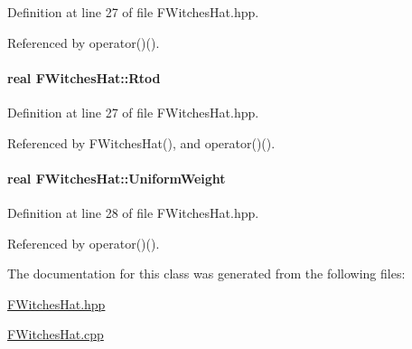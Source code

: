 \-Definition at line 27 of file \-F\-Witches\-Hat.\-hpp.



\-Referenced by operator()().

\hypertarget{classFWitchesHat_aadb3c71d235e5857a08fccb5b6a1ffef}{
\paragraph[{\-Rtod}]{\setlength{\rightskip}{0pt plus 5cm}real {\bf \-F\-Witches\-Hat\-::\-Rtod}}}\label{classFWitchesHat_aadb3c71d235e5857a08fccb5b6a1ffef}


\-Definition at line 27 of file \-F\-Witches\-Hat.\-hpp.



\-Referenced by \-F\-Witches\-Hat(), and operator()().

\hypertarget{classFWitchesHat_adb3a9d40df656e50327d3c40c505fdb6}{
\paragraph[{\-Uniform\-Weight}]{\setlength{\rightskip}{0pt plus 5cm}real {\bf \-F\-Witches\-Hat\-::\-Uniform\-Weight}}}\label{classFWitchesHat_adb3a9d40df656e50327d3c40c505fdb6}


\-Definition at line 28 of file \-F\-Witches\-Hat.\-hpp.



\-Referenced by operator()().



\-The documentation for this class was generated from the following files\-:\begin{DoxyCompactItemize}
\item 
\hyperlink{FWitchesHat_8hpp}{\-F\-Witches\-Hat.\-hpp}\item 
\hyperlink{FWitchesHat_8cpp}{\-F\-Witches\-Hat.\-cpp}\end{DoxyCompactItemize}
